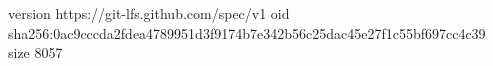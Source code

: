 version https://git-lfs.github.com/spec/v1
oid sha256:0ac9cccda2fdea4789951d3f9174b7e342b56c25dac45e27f1c55bf697cc4c39
size 8057
